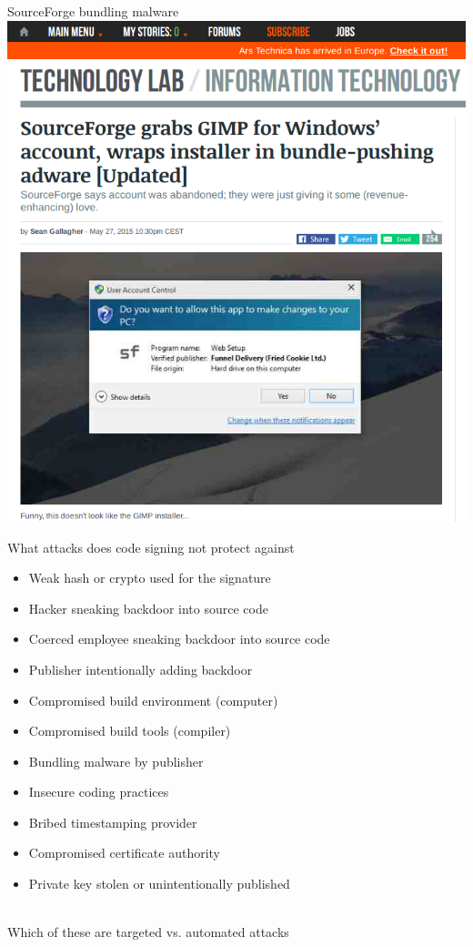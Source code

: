 \documentclass[11pt]{beamer}
\begin{document}
\begin{frame}{SourceForge bundling malware}
\includegraphics[scale=0.28]{sourceforge.png}
\end{frame}

\begin{frame}{What attacks does code signing not protect against}
\begin{itemize}
\item Weak hash or crypto used for the signature
\item Hacker sneaking backdoor into source code
\item Coerced employee sneaking backdoor into source code
\item Publisher intentionally adding backdoor
\item Compromised build environment (computer)
\item Compromised build tools (compiler)
\item Bundling malware by publisher
\item Insecure coding practices
\item Bribed timestamping provider
\item Compromised certificate authority
\item Private key stolen or unintentionally published
\end{itemize}
\\[0.2cm]
Which of these are targeted vs. automated attacks
\end{frame}
\end{document}
